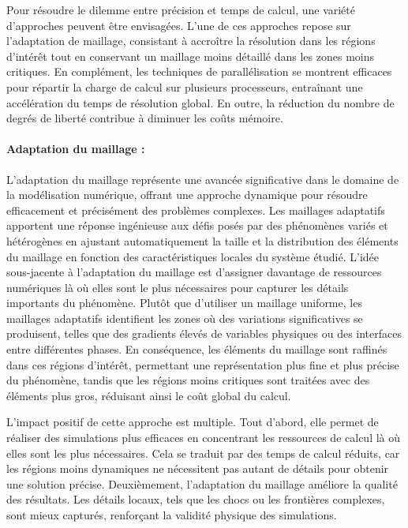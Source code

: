 Pour résoudre le dilemme entre précision et temps de calcul, une variété d'approches peuvent être envisagées. L'une de ces approches repose sur l'adaptation de maillage, consistant à accroître la résolution dans les régions d'intérêt tout en conservant un maillage moins détaillé dans les zones moins critiques. En complément, les techniques de parallélisation se montrent efficaces pour répartir la charge de calcul sur plusieurs processeurs, entraînant une accélération du temps de résolution global. En outre, la réduction du nombre de degrés de liberté contribue à diminuer les coûts mémoire.

\paragraph{Adaptation du maillage :}

L'adaptation du maillage représente une avancée significative dans le domaine de la modélisation numérique, offrant une approche dynamique pour résoudre efficacement et précisément des problèmes complexes. Les maillages adaptatifs apportent une réponse ingénieuse aux défis posés par des phénomènes variés et hétérogènes en ajustant automatiquement la taille et la distribution des éléments du maillage en fonction des caractéristiques locales du système étudié. L'idée sous-jacente à l'adaptation du maillage est d'assigner davantage de ressources numériques là où elles sont le plus nécessaires pour capturer les détails importants du phénomène. Plutôt que d'utiliser un maillage uniforme, les maillages adaptatifs identifient les zones où des variations significatives se produisent, telles que des gradients élevés de variables physiques ou des interfaces entre différentes phases. En conséquence, les éléments du maillage sont raffinés dans ces régions d'intérêt, permettant une représentation plus fine et plus précise du phénomène, tandis que les régions moins critiques sont traitées avec des éléments plus gros, réduisant ainsi le coût global du calcul.

L'impact positif de cette approche est multiple. Tout d'abord, elle permet de réaliser des simulations plus efficaces en concentrant les ressources de calcul là où elles sont les plus nécessaires. Cela se traduit par des temps de calcul réduits, car les régions moins dynamiques ne nécessitent pas autant de détails pour obtenir une solution précise. Deuxièmement, l'adaptation du maillage améliore la qualité des résultats. Les détails locaux, tels que les chocs ou les frontières complexes, sont mieux capturés, renforçant la validité physique des simulations.

